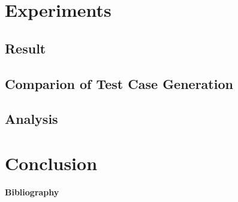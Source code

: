\documentclass[12pt,oneside]{book}
\begin{document}
\chapter{Experiments}
\section{Result}
\section{Comparion of Test Case Generation}
\section{Analysis}

\chapter{Conclusion}
\newpage

\begin{center}
\textbf{\Large{Bibliography}}
\end{center}
\end{document}
